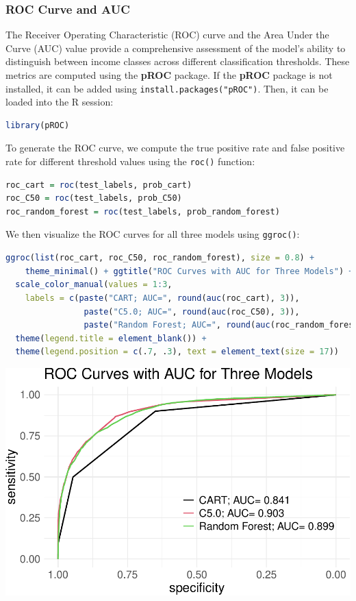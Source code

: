 \documentclass[
]{book}
\newcommand{\passthrough}[1]{#1}
\theoremstyle{definition}
\theoremstyle{definition}
\theoremstyle{definition}
\theoremstyle{definition}
\theoremstyle{remark}
\begin{document}
\subsubsection*{ROC Curve and AUC}\label{roc-curve-and-auc-2}

The Receiver Operating Characteristic (ROC) curve and the Area Under the Curve (AUC) value provide a comprehensive assessment of the model's ability to distinguish between income classes across different classification thresholds. These metrics are computed using the \textbf{pROC} package. If the \textbf{pROC} package is not installed, it can be added using \passthrough{\lstinline!install.packages("pROC")!}. Then, it can be loaded into the R session:

\begin{lstlisting}[language=R]
library(pROC)
\end{lstlisting}

To generate the ROC curve, we compute the true positive rate and false positive rate for different threshold values using the \passthrough{\lstinline!roc()!} function:

\begin{lstlisting}[language=R]
roc_cart = roc(test_labels, prob_cart)
roc_C50 = roc(test_labels, prob_C50)
roc_random_forest = roc(test_labels, prob_random_forest)
\end{lstlisting}

We then visualize the ROC curves for all three models using \passthrough{\lstinline!ggroc()!}:

\begin{lstlisting}[language=R]
ggroc(list(roc_cart, roc_C50, roc_random_forest), size = 0.8) + 
    theme_minimal() + ggtitle("ROC Curves with AUC for Three Models") +
  scale_color_manual(values = 1:3, 
    labels = c(paste("CART; AUC=", round(auc(roc_cart), 3)), 
                paste("C5.0; AUC=", round(auc(roc_C50), 3)), 
                paste("Random Forest; AUC=", round(auc(roc_random_forest), 3)))) +
  theme(legend.title = element_blank()) +
  theme(legend.position = c(.7, .3), text = element_text(size = 17))
\end{lstlisting}

\begin{center}\includegraphics[width=0.9\linewidth]{tree_files/figure-latex/unnamed-chunk-26-1} \end{center}
\end{document}
